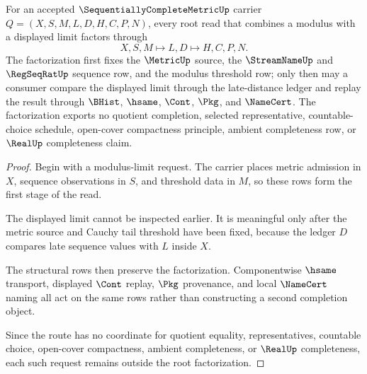 \begin{theorem}
\label{thm:sequentially-complete-metric-root-modulus-limit-factorization}
For an accepted $\SequentiallyCompleteMetricUp$ carrier $Q=(X,S,M,L,D,H,C,P,N)$, every root read that combines a modulus with a displayed limit factors through
$$
X,S,M \longmapsto L,D \longmapsto H,C,P,N .
$$
The factorization first fixes the $\MetricUp$ source, the $\StreamNameUp$ and $\RegSeqRatUp$ sequence row, and the modulus threshold row; only then may a consumer compare the displayed limit through the late-distance ledger and replay the result through $\BHist$, $\hsame$, $\Cont$, $\Pkg$, and $\NameCert$. The factorization exports no quotient completion, selected representative, countable-choice schedule, open-cover compactness principle, ambient completeness row, or $\RealUp$ completeness claim.
\end{theorem}
\begin{proof}
Begin with a modulus-limit request. The carrier places metric admission in $X$, sequence observations in $S$, and threshold data in $M$, so these rows form the first stage of the read.

The displayed limit cannot be inspected earlier. It is meaningful only after the metric source and Cauchy tail threshold have been fixed, because the ledger $D$ compares late sequence values with $L$ inside $X$.

The structural rows then preserve the factorization. Componentwise $\hsame$ transport, displayed $\Cont$ replay, $\Pkg$ provenance, and local $\NameCert$ naming all act on the same rows rather than constructing a second completion object.

Since the route has no coordinate for quotient equality, representatives, countable choice, open-cover compactness, ambient completeness, or $\RealUp$ completeness, each such request remains outside the root factorization.
\end{proof}

